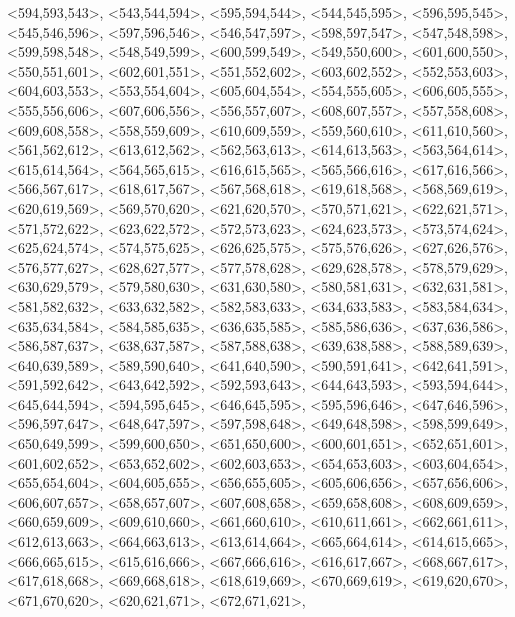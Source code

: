 \documentclass[a4paper,10pt]{article}
\begin{document}
\begin{eulernotebook}
\begin{euleroutput}
  <594,593,543>,
  <543,544,594>,
  <595,594,544>,
  <544,545,595>,
  <596,595,545>,
  <545,546,596>,
  <597,596,546>,
  <546,547,597>,
  <598,597,547>,
  <547,548,598>,
  <599,598,548>,
  <548,549,599>,
  <600,599,549>,
  <549,550,600>,
  <601,600,550>,
  <550,551,601>,
  <602,601,551>,
  <551,552,602>,
  <603,602,552>,
  <552,553,603>,
  <604,603,553>,
  <553,554,604>,
  <605,604,554>,
  <554,555,605>,
  <606,605,555>,
  <555,556,606>,
  <607,606,556>,
  <556,557,607>,
  <608,607,557>,
  <557,558,608>,
  <609,608,558>,
  <558,559,609>,
  <610,609,559>,
  <559,560,610>,
  <611,610,560>,
  <561,562,612>,
  <613,612,562>,
  <562,563,613>,
  <614,613,563>,
  <563,564,614>,
  <615,614,564>,
  <564,565,615>,
  <616,615,565>,
  <565,566,616>,
  <617,616,566>,
  <566,567,617>,
  <618,617,567>,
  <567,568,618>,
  <619,618,568>,
  <568,569,619>,
  <620,619,569>,
  <569,570,620>,
  <621,620,570>,
  <570,571,621>,
  <622,621,571>,
  <571,572,622>,
  <623,622,572>,
  <572,573,623>,
  <624,623,573>,
  <573,574,624>,
  <625,624,574>,
  <574,575,625>,
  <626,625,575>,
  <575,576,626>,
  <627,626,576>,
  <576,577,627>,
  <628,627,577>,
  <577,578,628>,
  <629,628,578>,
  <578,579,629>,
  <630,629,579>,
  <579,580,630>,
  <631,630,580>,
  <580,581,631>,
  <632,631,581>,
  <581,582,632>,
  <633,632,582>,
  <582,583,633>,
  <634,633,583>,
  <583,584,634>,
  <635,634,584>,
  <584,585,635>,
  <636,635,585>,
  <585,586,636>,
  <637,636,586>,
  <586,587,637>,
  <638,637,587>,
  <587,588,638>,
  <639,638,588>,
  <588,589,639>,
  <640,639,589>,
  <589,590,640>,
  <641,640,590>,
  <590,591,641>,
  <642,641,591>,
  <591,592,642>,
  <643,642,592>,
  <592,593,643>,
  <644,643,593>,
  <593,594,644>,
  <645,644,594>,
  <594,595,645>,
  <646,645,595>,
  <595,596,646>,
  <647,646,596>,
  <596,597,647>,
  <648,647,597>,
  <597,598,648>,
  <649,648,598>,
  <598,599,649>,
  <650,649,599>,
  <599,600,650>,
  <651,650,600>,
  <600,601,651>,
  <652,651,601>,
  <601,602,652>,
  <653,652,602>,
  <602,603,653>,
  <654,653,603>,
  <603,604,654>,
  <655,654,604>,
  <604,605,655>,
  <656,655,605>,
  <605,606,656>,
  <657,656,606>,
  <606,607,657>,
  <658,657,607>,
  <607,608,658>,
  <659,658,608>,
  <608,609,659>,
  <660,659,609>,
  <609,610,660>,
  <661,660,610>,
  <610,611,661>,
  <662,661,611>,
  <612,613,663>,
  <664,663,613>,
  <613,614,664>,
  <665,664,614>,
  <614,615,665>,
  <666,665,615>,
  <615,616,666>,
  <667,666,616>,
  <616,617,667>,
  <668,667,617>,
  <617,618,668>,
  <669,668,618>,
  <618,619,669>,
  <670,669,619>,
  <619,620,670>,
  <671,670,620>,
  <620,621,671>,
  <672,671,621>,

\end{euleroutput}
\end{eulernotebook}
\end{document}
